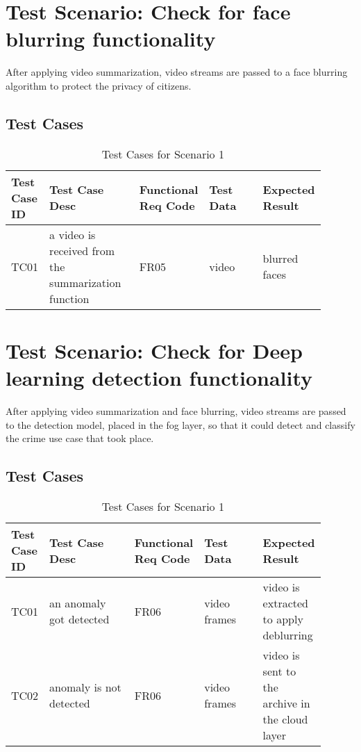 \documentclass[12pt]{article}
\begin{document}
\newpage
\section{Test Scenario: Check for face blurring functionality}\label{sec:TSy}
After applying video summarization, video streams are passed to a face blurring algorithm to protect the privacy of citizens.
\subsection{Test Cases}
\begin{table}[h]
\caption{Test Cases for Scenario 1}
\label{tab:TC1}
\begin{tabular}{|p{0.1\linewidth}|p{0.3\linewidth}|p{0.1\linewidth}|p{0.2\linewidth}|p{0.2\linewidth}|}
\hline
Test Case ID & Test Case Desc & Functional Req Code & Test Data & Expected Result \\ \hline
TC01  & a video is received from the summarization function & FR05 &  video   &  blurred faces                \\ \hline

\end{tabular}
\end{table}



\section{Test Scenario: Check for Deep learning detection functionality}\label{sec:TSy}
After applying video summarization and face blurring, video streams are passed to the detection model, placed in the fog layer, so that it could detect and classify the crime use case that took place. 
\subsection{Test Cases}
\begin{table}[h]
\caption{Test Cases for Scenario 1}
\label{tab:TC1}
\begin{tabular}{|p{0.1\linewidth}|p{0.3\linewidth}|p{0.1\linewidth}|p{0.2\linewidth}|p{0.2\linewidth}|}
\hline
Test Case ID & Test Case Desc & Functional Req Code & Test Data & Expected Result \\ \hline
TC01  & an anomaly got detected & FR06 &  video frames   & video is extracted to apply deblurring                \\ \hline
TC02 & anomaly is not detected   & FR06    &  video frames      &  video is sent to the archive in the cloud layer         \\ \hline

\end{tabular}
\end{table}
\end{document}
